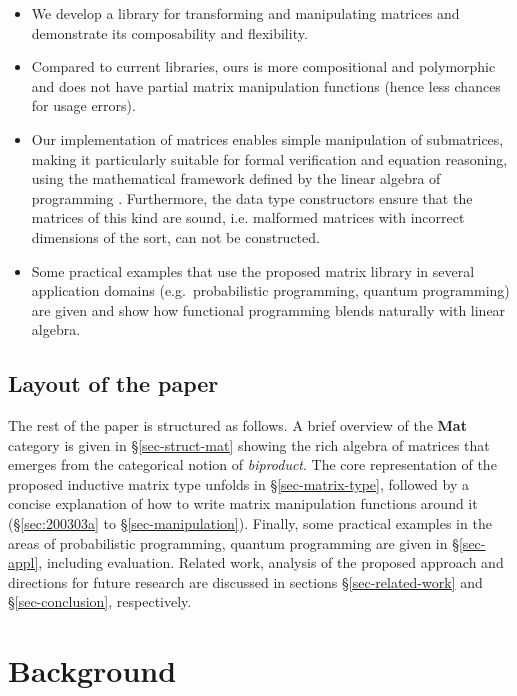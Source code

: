 \documentclass[sigplan,screen]{acmart}\settopmatter{}
\def\doc{paper}
\begin{document}
\begin{itemize}
    \item We develop a library for transforming and manipulating matrices and demonstrate its composability and flexibility.
    \item Compared to current libraries, ours is more compositional and polymorphic and does not have partial matrix manipulation functions (hence less chances for usage errors). 
    \item Our implementation of matrices enables simple manipulation of submatrices, making it particularly suitable for formal verification and equation reasoning, using the mathematical framework defined by the linear algebra of programming \citep{oliveira2012towards}. Furthermore, the data type constructors ensure that the matrices of this kind are sound, i.e. malformed matrices with incorrect dimensions of the sort, can not be constructed.
    \item Some practical examples that use the proposed matrix library in several application domains (e.g.\ probabilistic programming, quantum programming) are given and show how functional programming blends naturally with linear algebra. 
\end{itemize}{}

\subsection{Layout of the \doc}

The rest of the paper is structured as follows. A brief overview of the \textbf{Mat} category is given in \S\ref{sec-struct-mat} showing the rich algebra of matrices that emerges from the categorical notion of \emph{biproduct}.
The core representation of the proposed inductive matrix type unfolds in \S\ref{sec-matrix-type}, followed by a concise explanation of how to write matrix manipulation functions around it (\S\ref{sec:200303a} to \S\ref{sec-manipulation}). Finally, some practical examples in the areas of probabilistic programming, quantum programming are given in \S\ref{sec-appl}, including evaluation. Related work, analysis of the proposed approach and directions for future research are discussed in sections \S\ref{sec-related-work} and \S\ref{sec-conclusion}, respectively.

\section{Background}\label{sec-motivation}
\end{document}
